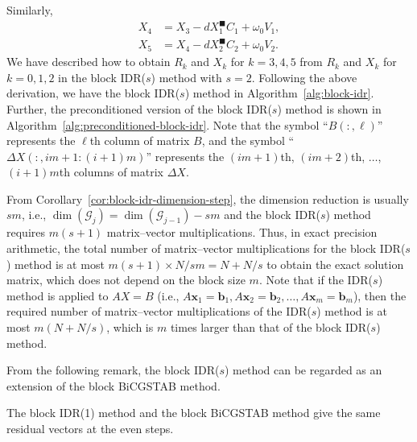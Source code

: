 {Similarly,}
\[\begin{aligned}X_4&=X_3-dX_1^{\blacksquare}C_1+\omega_0V_1,\\X_5&=X_4-dX_2^{\blacksquare}C_2+\omega_0V_2.\end{aligned}\]
{We have described how to obtain $R_k$ and $X_k$ for $k=3,4,5$ from $R_k$ and $X_k$ for $k=0,1,2$ in the block IDR($s$) method with $s=2$. Following the above derivation, we have the block IDR($s$) method in Algorithm\ \ref{alg:block-idr}. Further, the preconditioned version of the block IDR($s$) method is shown in Algorithm\ \ref{alg:preconditioned-block-idr}. Note that the symbol ``$B(:,\ell)$'' represents the $\ell$th column of matrix $B$, and the symbol ``$\Delta X(:,im+1:(i+1)m)$'' represents the $(im+1)$th, $(im+2)$th, $\ldots$, $(i+1)m$th columns of matrix $\Delta X$.}
\par{}
\begin{Remark}\label{rem:block-idr-matvec-bound}
{From Corollary\ \ref{cor:block-idr-dimension-step}, the dimension reduction is usually $sm$, i.e., $\dim(\mathcal G_j)=\dim(\mathcal G_{j-1})-sm$ and the block IDR($s$) method requires $m(s+1)$ matrix--vector multiplications. Thus, in exact precision arithmetic, the total number of matrix--vector multiplications for the block IDR($s$) method is at most $m(s+1)\times N/sm=N+N/s$ to obtain the exact solution matrix, which does not depend on the block size $m$. Note that if the IDR($s$) method is applied to $AX=B$ (i.e., $A\bm x_1=\bm b_1,A\bm x_2=\bm b_2,\ldots,A\bm x_m=\bm b_m$), then the required number of matrix--vector multiplications of the IDR($s$) method is at most $m(N+N/s)$, which is $m$ times larger than that of the block IDR($s$) method.}
\end{Remark}
{From the following remark, the block IDR($s$) method can be regarded as an extension of the block BiCGSTAB method.}
\par{}
\begin{Remark}\label{rem:block-idr-bicgstab-equivalence}
{The block IDR(1) method and the block BiCGSTAB method give the same residual vectors at the even steps.}
\end{Remark}
